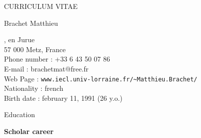 \documentclass[10pt,a4paper]{report}
\begin{document}
\begin{center}
{\selectfont
\begin{LARGE}
CURRICULUM VITAE
\end{LARGE}

\begin{large}
Brachet Matthieu
\end{large}

\hrulefill
}
\end{center}

, en Jurue\\
57 000 Metz, France
\vspace{0.2cm}\\
Phone number : +33 6 43 50 07 86\\
E-mail : brachetmat@free.fr\\
Web Page : \verb?www.iecl.univ-lorraine.fr/~Matthieu.Brachet/?
\vspace{0.2cm}\\
Nationality : french\\
Birth date : february 11, 1991 (26 y.o.)


\vspace{1cm}
\noindent
{\selectfont
\begin{Large}
Education
\end{Large}
\hrulefill
}

\vspace{0.4cm}
\noindent
{\selectfont
\textbf{Scholar career}
}
\end{document}
